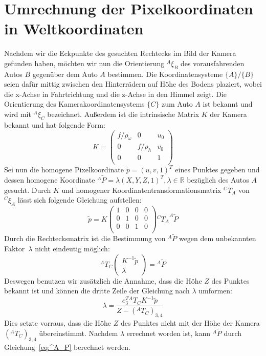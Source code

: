 \section{Umrechnung der Pixelkoordinaten in Weltkoordinaten}

Nachdem wir die Eckpunkte des gesuchten Rechtecks im Bild der Kamera gefunden haben, möchten wir nun die Orientierung $^A\xi_B$ des vorausfahrenden Autos $B$ gegenüber dem Auto $A$ bestimmen.
Die Koordinatensysteme $\{A\}/\{B\}$ seien dafür mittig zwischen den Hinterrädern auf Höhe des Bodens plaziert, wobei die x-Achse in Fahrtrichtung und die z-Achse in den Himmel zeigt. Die Orientierung des Kamerakoordinatensystems $\{C\}$ zum Auto $A$ ist bekannt und wird mit $^A\xi_C$ bezeichnet. Außerdem ist die intrinsische Matrix $K$ der Kamera bekannt und hat folgende Form:
\begin{equation*}
K= \begin{pmatrix} f/\rho_\omega & 0 & u_0 \\ 0 & f/\rho_h & v_0 \\ 0 & 0 & 1 \\ \end{pmatrix}
\end{equation*}
Sei nun die homogene Pixelkoordinate $\tilde{p} = (u,v,1)^T$ eines Punktes gegeben und dessen homogene Koordinate $^A\tilde{P} = \lambda(X,Y,Z,1)^T, \lambda \in \mathbb{R}$ bezüglich des Autos $A$ gesucht. Durch $K$ und homogener Koordinatentransformationsmatrix ${^CT_A}$ von $^C\xi_A$ lässt sich folgende Gleichung aufstellen:
\begin{equation*}
\label{eq:problem}
	\tilde{p} = K \begin{pmatrix} 1 & 0 & 0 & 0 \\ 0 & 1 & 0 & 0 \\ 0 & 0 & 1 & 0 \\ \end{pmatrix} {^CT_A} ^A\tilde{P}
\end{equation*}
Durch die Rechtecksmatrix ist die Bestimmung von $^A\tilde{P}$ wegen dem unbekannten Faktor~$\lambda$ nicht eindeutig möglich:
\begin{equation}
\label{eq:^A_P}
	{^AT_C} \begin{pmatrix} K^{-1}\tilde{p} \\ \lambda \end{pmatrix} = {^A\tilde{P}}
\end{equation}
Deswegen benutzen wir zusätzlich die Annahme, dass die Höhe $Z$ des Punktes bekannt ist und können die dritte Zeile der Gleichung nach $\lambda$ umformen:
\begin{equation*}
	\lambda = \frac{e_3^T{^AT_C} K^{-1}\tilde{p}}{Z - {(^AT_C)}_{3,4}}
\end{equation*}
Dies setzte vorraus, dass die Höhe $Z$ des Punktes nicht mit der Höhe der Kamera ${(^AT_C)}_{3,4}$ übereinstimmt. Nachdem $\lambda$ errechnet worden ist, kann $^A\tilde{P}$ durch Gleichung~\ref{eq:^A_P} berechnet werden.

